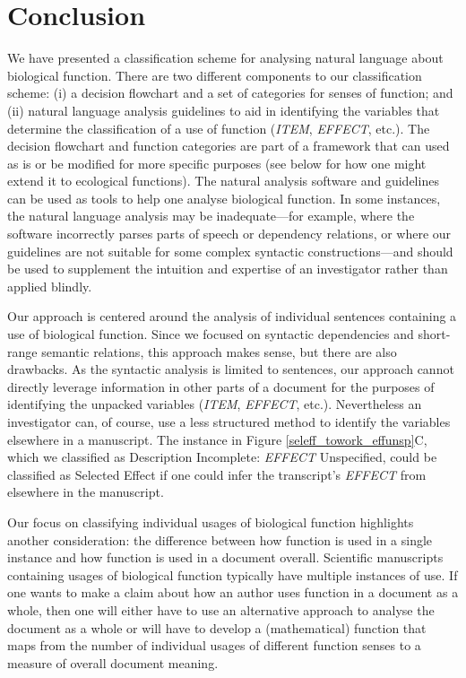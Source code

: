 \documentclass{article}
\begin{document}
\section{Conclusion}
\label{sec:conclusion}

We have presented a classification scheme for analysing natural language about biological function.
There are two different components to our classification scheme: (i) a decision flowchart and a set of categories for senses of function; and (ii) natural language analysis guidelines to aid in identifying the variables that determine the classification of a use of function (\emph{ITEM}, \emph{EFFECT}, etc.).
The decision flowchart and function categories are part of a framework that can used as is or be modified for more specific purposes (see below for how one might extend it to ecological functions).
The natural analysis software and guidelines can be used as tools to help one analyse biological function.
In some instances, the natural language analysis may be inadequate---for example, where the software incorrectly parses parts of speech or dependency relations, or where our guidelines are not suitable for some complex syntactic constructions---and should be used to supplement the intuition and expertise of an investigator rather than applied blindly.

Our approach is centered around the analysis of individual sentences containing a use of biological function.
Since we focused on syntactic dependencies and short-range semantic relations, this approach makes sense, but there are also drawbacks.
As the syntactic analysis is limited to sentences, our approach cannot directly leverage information in other parts of a document for the purposes of identifying the unpacked variables (\emph{ITEM}, \emph{EFFECT}, etc.).
Nevertheless an investigator can, of course, use a less structured method to identify the variables elsewhere in a manuscript.
The instance in Figure \ref{seleff_towork_effunsp}C, which we classified as Description Incomplete: \emph{EFFECT} Unspecified, could be classified as Selected Effect if one could infer the transcript's \emph{EFFECT} from elsewhere in the manuscript.

Our focus on classifying individual usages of biological function highlights another consideration: the difference between how function is used in a single instance and how function is used in a document overall.
Scientific manuscripts containing usages of biological function typically have multiple instances of use.
If one wants to make a claim about how an author uses function in a document as a whole, then one will either have to use an alternative approach to analyse the document as a whole or will have to develop a (mathematical) function that maps from the number of individual usages of different function senses to a measure of overall document meaning.
\end{document}
